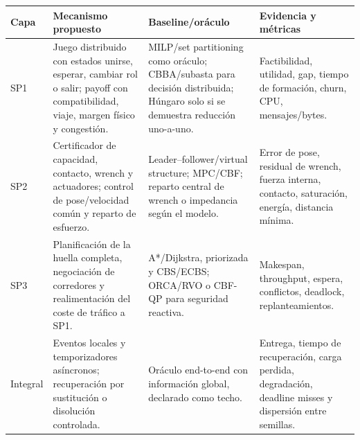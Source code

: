 \documentclass[10pt,letterpaper]{article}
\newcommand{\subh}[1]{\par\vspace{1.6pt}{\sffamily\fontsize{8.9}{9.5}\selectfont\bfseries\color{orange}#1\par}\vspace{.3pt}}
\begin{document}
\subh{Diseño mínimo y comparaciones}
\renewcommand{\arraystretch}{1.13}
\setlength{\tabcolsep}{2.7pt}
\fontsize{7.05}{7.7}\selectfont
\begin{tabularx}{\linewidth}{C{11mm} L{33mm} L{41mm} Y}
\toprule
\textbf{Capa} & \textbf{Mecanismo propuesto} & \textbf{Baseline/oráculo} & \textbf{Evidencia y métricas}\\
\midrule
SP1 & Juego distribuido con estados unirse, esperar, cambiar rol o salir; payoff con compatibilidad, viaje, margen físico y congestión. & MILP/set partitioning como oráculo; CBBA/subasta para decisión distribuida; Húngaro solo si se demuestra reducción uno-a-uno. & Factibilidad, utilidad, gap, tiempo de formación, churn, CPU, mensajes/bytes.\\
SP2 & Certificador de capacidad, contacto, wrench y actuadores; control de pose/velocidad común y reparto de esfuerzo. & Leader--follower/virtual structure; MPC/CBF; reparto central de wrench o impedancia según el modelo. & Error de pose, residual de wrench, fuerza interna, contacto, saturación, energía, distancia mínima.\\
SP3 & Planificación de la huella completa, negociación de corredores y realimentación del coste de tráfico a SP1. & A*/Dijkstra, priorizada y CBS/ECBS; ORCA/RVO o CBF-QP para seguridad reactiva. & Makespan, throughput, espera, conflictos, deadlock, replanteamientos.\\
Integral & Eventos locales y temporizadores asíncronos; recuperación por sustitución o disolución controlada. & Oráculo end-to-end con información global, declarado como techo. & Entrega, tiempo de recuperación, carga perdida, degradación, deadline misses y dispersión entre semillas.\\
\bottomrule
\end{tabularx}
\normalsize\fontsize{8.45}{9.35}\selectfont
\end{document}
